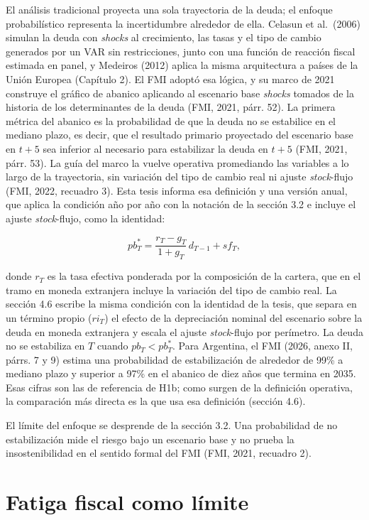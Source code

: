 El análisis tradicional proyecta una sola trayectoria de la deuda; el
enfoque probabilístico representa la incertidumbre alrededor de ella.
Celasun et al.~(2006) simulan la deuda con \emph{shocks} al crecimiento,
las tasas y el tipo de cambio generados por un VAR sin restricciones,
junto con una función de reacción fiscal estimada en panel, y Medeiros
(2012) aplica la misma arquitectura a países de la Unión Europea
(Capítulo 2). El FMI adoptó esa lógica, y su marco de 2021 construye el
gráfico de abanico aplicando al escenario base \emph{shocks} tomados de
la historia de los determinantes de la deuda (FMI, 2021, párr. 52). La
primera métrica del abanico es la probabilidad de que la deuda no se
estabilice en el mediano plazo, es decir, que el resultado primario
proyectado del escenario base en \(t+5\) sea inferior al necesario para
estabilizar la deuda en \(t+5\) (FMI, 2021, párr. 53). La guía del marco
la vuelve operativa promediando las variables a lo largo de la
trayectoria, sin variación del tipo de cambio real ni ajuste
\emph{stock}-flujo (FMI, 2022, recuadro 3). Esta tesis informa esa
definición y una versión anual, que aplica la condición año por año con
la notación de la sección 3.2 e incluye el ajuste \emph{stock}-flujo,
como la identidad:

\[pb^*_T = \frac{r_T - g_T}{1+g_T}\, d_{T-1} + sf_T ,\]

donde \(r_T\) es la tasa efectiva ponderada por la composición de la
cartera, que en el tramo en moneda extranjera incluye la variación del
tipo de cambio real. La sección 4.6 escribe la misma condición con la
identidad de la tesis, que separa en un término propio (\(ri_T\)) el
efecto de la depreciación nominal del escenario sobre la deuda en moneda
extranjera y escala el ajuste \emph{stock}-flujo por perímetro. La deuda
no se estabiliza en \(T\) cuando \(pb_T < pb^*_T\). Para Argentina, el
FMI (2026, anexo II, párrs. 7 y 9) estima una probabilidad de
estabilización de alrededor de 99\% a mediano plazo y superior a 97\% en
el abanico de diez años que termina en 2035. Esas cifras son las de
referencia de H1b; como surgen de la definición operativa, la
comparación más directa es la que usa esa definición (sección 4.6).

El límite del enfoque se desprende de la sección 3.2. Una probabilidad
de no estabilización mide el riesgo bajo un escenario base y no prueba
la insostenibilidad en el sentido formal del FMI (FMI, 2021, recuadro
2).

\section{Fatiga fiscal como límite}

